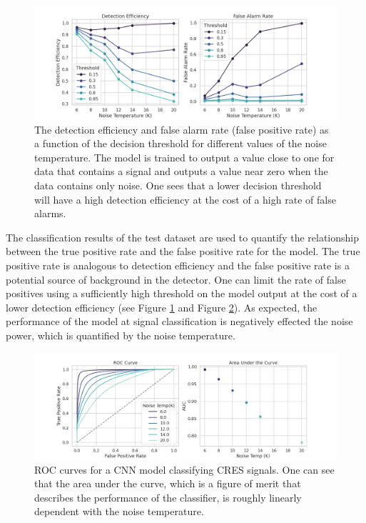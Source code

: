 \begin{figure}[htbp]
    \centering
    \includegraphics*[width=1.0\textwidth]{figs/Chapter-4/210625_plot_dfcnn_efficiency_vs_noise_temp.png}
    \caption{\label{fig:chap4-dfcnn-efficiency} The detection efficiency and false alarm rate (false positive rate) as a function of the decision threshold for different values of the noise temperature. The model is trained to output a value close to one for data that contains a signal and outputs a value near zero when the data contains only noise. One sees that a lower decision threshold will have a high detection efficiency at the cost of a high rate of false alarms. }
\end{figure}

The classification results of the test dataset are used to quantify the relationship between the true positive rate and the false positive rate for the model. The true positive rate is analogous to detection efficiency and the false positive rate is a potential source of background in the detector. One can limit the rate of false positives using a sufficiently high threshold on the model output at the cost of a lower detection efficiency (see Figure \ref{fig:chap4-dfcnn-efficiency} and Figure \ref{fig:chap4-dfcnn-roc}). As expected, the performance of the model at signal classification is negatively effected the noise power, which is quantified by the noise temperature.

\begin{figure}[htbp]
    \centering
    \includegraphics*[width=1.0\textwidth]{figs/Chapter-4/210625_plot_dfcnn_roc_vs_noise_temp.png}
    \caption{\label{fig:chap4-dfcnn-roc}ROC curves for a CNN model classifying CRES signals. One can see that the area under the curve, which is a figure of merit that describes the performance of the classifier, is roughly linearly dependent with the noise temperature.}
\end{figure}


